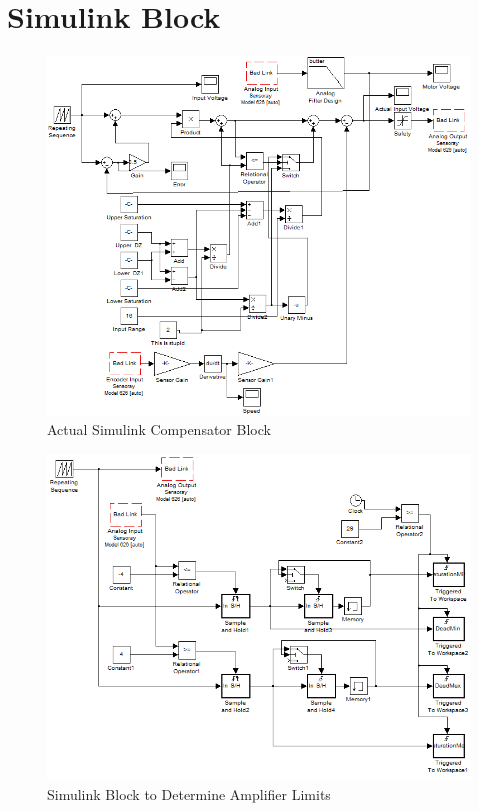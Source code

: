 \section{Simulink Block}

\begin{figure}[h]
    \centering
    \includegraphics[width=.95\textwidth]{images/Simulink.PNG}
    \caption{Actual Simulink Compensator Block}
    \label{fig:simulink}
\end{figure}

\begin{figure}[h]
    \centering
    \includegraphics[width=.95\textwidth]{images/SimulinkFinder.PNG}
    \caption{Simulink Block to Determine Amplifier Limits}
    \label{fig:simulinkfinder}
\end{figure}
